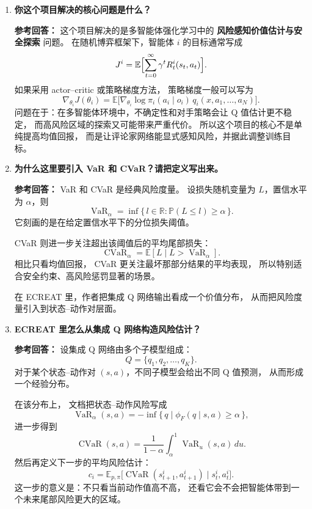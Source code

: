 \documentclass[11pt,a4paper]{ctexart}
\begin{document}
\begin{enumerate}[leftmargin=*, label=\textbf{Q\arabic*.}]

\item \textbf{你这个项目解决的核心问题是什么？}

\textbf{参考回答：}
这个项目解决的是多智能体强化学习中的 \textbf{风险感知价值估计与安全探索} 问题。
在随机博弈框架下，智能体 $i$ 的目标通常写成
\[
J^i
=
\mathbb{E}
\Bigl[
\sum_{t=0}^{\infty}\gamma^t R_t^i(s_t,a_t)
\Bigr].
\]
如果采用 actor--critic 或策略梯度方法，
策略梯度一般可以写为
\[
\nabla_{\theta_i} J(\theta_i)
=
\mathbb{E}
\bigl[
\nabla_{\theta_i}\log \pi_i(a_i\mid o_i)\, q_i(x,a_1,\dots,a_N)
\bigr].
\]
问题在于：在多智能体环境中，不确定性和对手策略会让 Q 值估计更不稳定，
而高风险区域的探索又可能带来严重代价。
所以这个项目的核心不是单纯提高均值回报，
而是让评论家网络能显式感知风险，并据此调整训练目标。

\item \textbf{为什么这里要引入 VaR 和 CVaR？请把定义写出来。}

\textbf{参考回答：}
VaR 和 CVaR 是经典风险度量。
设损失随机变量为 $L$，置信水平为 $\alpha$，则
\[
\operatorname{VaR}_{\alpha}
=
\inf\{\, l\in\mathbb{R} : \mathbb{P}(L\le l)\ge \alpha \,\}.
\]
它刻画的是在给定置信水平下的分位损失阈值。

CVaR 则进一步关注超出该阈值后的平均尾部损失：
\[
\operatorname{CVaR}_{\alpha}
=
\mathbb{E}[L \mid L > \operatorname{VaR}_{\alpha} ].
\]
相比只看均值回报，
CVaR 更关注最坏那部分结果的平均表现，
所以特别适合安全约束、高风险惩罚显著的场景。

在 ECREAT 里，作者把集成 Q 网络输出看成一个价值分布，
从而把风险度量引入到状态--动作对层面。

\item \textbf{ECREAT 里怎么从集成 Q 网络构造风险估计？}

\textbf{参考回答：}
设集成 Q 网络由多个子模型组成：
\[
Q = \{q_1,q_2,\dots,q_K\}.
\]
对于某个状态--动作对 $(s,a)$，不同子模型会给出不同 Q 值预测，
从而形成一个经验分布。

在该分布上，
文档把状态--动作风险写成
\[
\operatorname{VaR}_{\alpha}(s,a)
=
-
\inf\{\, q \mid \phi_F(q\mid s,a)\ge \alpha \,\},
\]
进一步得到
\[
\operatorname{CVaR}(s,a)
=
\frac{1}{1-\alpha}
\int_{\alpha}^{1}
\operatorname{VaR}_{u}(s,a)\,du.
\]
然后再定义下一步的平均风险估计：
\[
c_i
=
\mathbb{E}_{p,\pi}
\bigl[
\operatorname{CVaR}(s_{t+1}^i,a_{t+1}^i)
\mid s_t^i,a_t^i
\bigr].
\]
这一步的意义是：不只看当前动作值高不高，
还看它会不会把智能体带到一个未来尾部风险更大的区域。


\end{enumerate}
\end{document}
